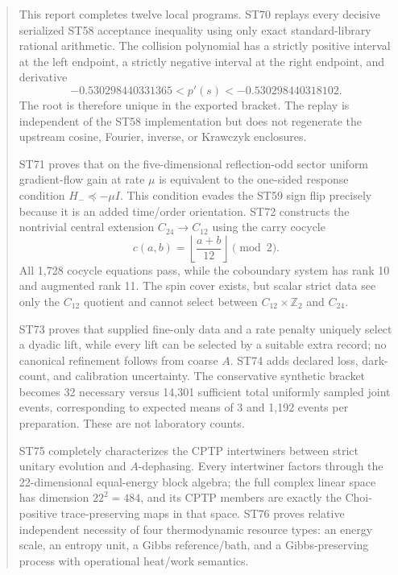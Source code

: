 \documentclass[11pt,a4paper]{article}
\begin{document}
\begin{abstract}
This report completes twelve local programs. ST70 replays every decisive serialized ST58 acceptance inequality using only exact standard-library rational arithmetic. The collision polynomial has a strictly positive interval at the left endpoint, a strictly negative interval at the right endpoint, and derivative
\[
-0.530298440331365 < p'(s) < -0.530298440318102.
\]
The root is therefore unique in the exported bracket. The replay is independent of the ST58 implementation but does not regenerate the upstream cosine, Fourier, inverse, or Krawczyk enclosures.

ST71 proves that on the five-dimensional reflection-odd sector uniform gradient-flow gain at rate $\mu$ is equivalent to the one-sided response condition $H_-\preceq-\mu I$. This condition evades the ST59 sign flip precisely because it is an added time/order orientation. ST72 constructs the nontrivial central extension $C_{24}\to C_{12}$ using the carry cocycle
\[
c(a,b)=\left\lfloor\frac{a+b}{12}\right\rfloor\pmod2.
\]
All 1,728 cocycle equations pass, while the coboundary system has rank 10 and augmented rank 11. The spin cover exists, but scalar strict data see only the $C_{12}$ quotient and cannot select between $C_{12}\times\mathbb Z_2$ and $C_{24}$.

ST73 proves that supplied fine-only data and a rate penalty uniquely select a dyadic lift, while every lift can be selected by a suitable extra record; no canonical refinement follows from coarse $A$. ST74 adds declared loss, dark-count, and calibration uncertainty. The conservative synthetic bracket becomes 32 necessary versus 14,301 sufficient total uniformly sampled joint events, corresponding to expected means of 3 and 1,192 events per preparation. These are not laboratory counts.

ST75 completely characterizes the CPTP intertwiners between strict unitary evolution and $A$-dephasing. Every intertwiner factors through the 22-dimensional equal-energy block algebra; the full complex linear space has dimension $22^2=484$, and its CPTP members are exactly the Choi-positive trace-preserving maps in that space. ST76 proves relative independent necessity of four thermodynamic resource types: an energy scale, an entropy unit, a Gibbs reference/bath, and a Gibbs-preserving process with operational heat/work semantics.


\end{abstract}
\end{document}
